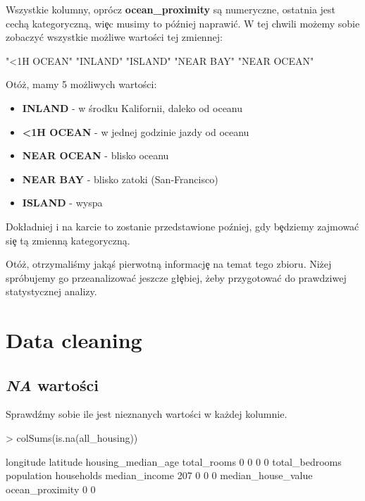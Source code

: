 \documentclass{article}
\begin{document}
\noindent
\quad Wszystkie kolumny, oprócz \textbf{ocean\_proximity} są numeryczne, ostatnia jest cechą kategoryczną, wi\c ec musimy to później naprawi\'c. W tej chwili możemy sobie zobaczy\'c wszystkie możliwe wartości tej zmiennej:

\begin{Schunk}
\begin{Soutput}
[1] "<1H OCEAN"  "INLAND"     "ISLAND"     "NEAR BAY"   "NEAR OCEAN"
\end{Soutput}
\end{Schunk}

\noindent
\quad Otóż, mamy 5 możliwych wartości:
\begin{itemize}
  \item \textbf{INLAND} - w środku Kalifornii, daleko od oceanu
  \item \textbf{<1H OCEAN} - w jednej godzinie jazdy od oceanu
  \item \textbf{NEAR OCEAN} - blisko oceanu
  \item \textbf{NEAR BAY} - blisko zatoki (San-Francisco)
  \item \textbf{ISLAND} - wyspa
\end{itemize}

\noindent
\quad Dok\l adniej i na karcie to zostanie przedstawione poźniej, gdy b\c edziemy zajmowa\'c si\c e tą zmienną kategoryczną.

\noindent
\quad Otóż, otrzymaliśmy jakąś pierwotną informacj\c e na temat tego zbioru. Niżej spróbujemy go przeanalizowa\'c jeszcze g\l\c ebiej, żeby przygotowa\'c do prawdziwej statystycznej analizy.

\section{Data cleaning}
\subsection{\textit{NA} wartości}
\quad Sprawdźmy sobie ile jest nieznanych wartości w każdej kolumnie.

\begin{Schunk}
\begin{Sinput}
> colSums(is.na(all_housing))
\end{Sinput}
\begin{Soutput}
         longitude           latitude housing_median_age        total_rooms 
                 0                  0                  0                  0 
    total_bedrooms         population         households      median_income 
               207                  0                  0                  0 
median_house_value    ocean_proximity 
                 0                  0 
\end{Soutput}
\end{Schunk}
\end{document}
